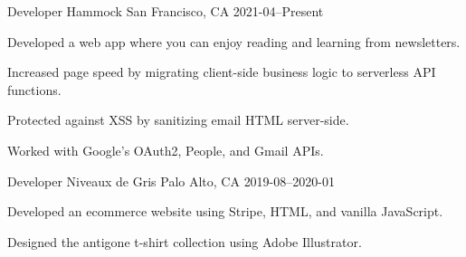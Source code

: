\begin{cventries}
  \cventry
    {Developer} %
    {Hammock} %
    {San Francisco, CA} %
    {2021-04–Present} %
    {
      \begin{cvitems} %
        \item {Developed a web app where you can enjoy reading and learning from newsletters.}
        \item {Increased page speed by migrating client-side business logic to serverless API functions.}
        \item {Protected against XSS by sanitizing email HTML server-side.}
        \item {Worked with Google's OAuth2, People, and Gmail APIs.}
      \end{cvitems}
    }

  \cventry
    {Developer} %
    {Niveaux de Gris} %
    {Palo Alto, CA} %
    {2019-08–2020-01} %
    {
      \begin{cvitems} %
        \item {Developed an ecommerce website using Stripe, HTML, and vanilla JavaScript.}
        \item {Designed the antigone t-shirt collection using Adobe Illustrator.}
      \end{cvitems}
    }

\end{cventries}
